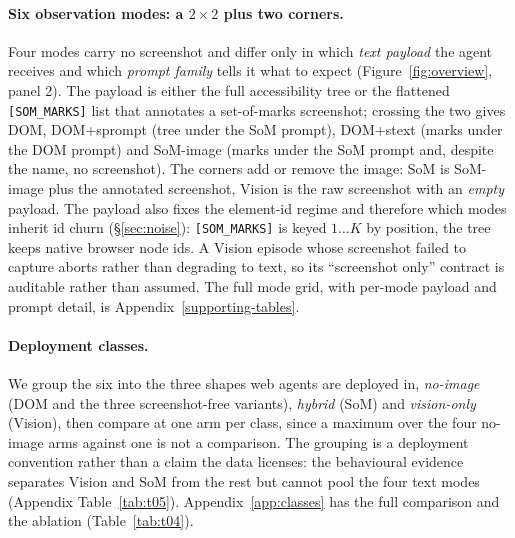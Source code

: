 \paragraph{Six observation modes: a $2\times2$ plus two corners.} Four modes carry no screenshot and differ only in which \emph{text payload} the agent receives and which \emph{prompt family} tells it what to expect (Figure~\ref{fig:overview}, panel 2). The payload is either the full accessibility tree or the flattened \texttt{[SOM\_MARKS]} list that annotates a set-of-marks screenshot; crossing the two gives DOM, DOM+sprompt (tree under the SoM prompt), DOM+stext (marks under the DOM prompt) and SoM-image (marks under the SoM prompt and, despite the name, no screenshot). The corners add or remove the image: SoM is SoM-image plus the annotated screenshot, Vision is the raw screenshot with an \emph{empty} payload. The payload also fixes the element-id regime and therefore which modes inherit id churn (\S\ref{sec:noise}): \texttt{[SOM\_MARKS]} is keyed $1\ldots K$ by position, the tree keeps native browser node ids. A Vision episode whose screenshot failed to capture aborts rather than degrading to text, so its ``screenshot only'' contract is auditable rather than assumed. The full mode grid, with per-mode payload and prompt detail, is Appendix~\ref{supporting-tables}.

\paragraph{Deployment classes.} We group the six into the three shapes web agents are deployed in, \emph{no-image} (DOM and the three screenshot-free variants), \emph{hybrid} (SoM) and \emph{vision-only} (Vision), then compare at one arm per class, since a maximum over the four no-image arms against one is not a comparison. The grouping is a deployment convention rather than a claim the data licenses: the behavioural evidence separates Vision and SoM from the rest but cannot pool the four text modes (Appendix Table~\ref{tab:t05}). Appendix~\ref{app:classes} has the full comparison and the ablation (Table~\ref{tab:t04}).

